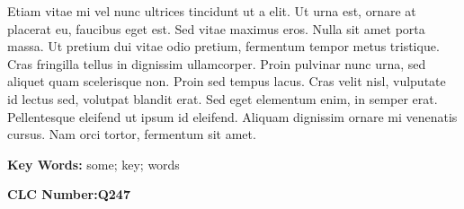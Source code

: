 Etiam vitae mi vel nunc ultrices tincidunt ut a elit. Ut urna est, ornare at placerat eu, faucibus eget est. Sed vitae maximus eros. Nulla sit amet porta massa. Ut pretium dui vitae odio pretium, fermentum tempor metus tristique. Cras fringilla tellus in dignissim ullamcorper. Proin pulvinar nunc urna, sed aliquet quam scelerisque non. Proin sed tempus lacus. Cras velit nisl, vulputate id lectus sed, volutpat blandit erat. Sed eget elementum enim, in semper erat. Pellentesque eleifend ut ipsum id eleifend. Aliquam dignissim ornare mi venenatis cursus. Nam orci tortor, fermentum sit amet.

\bigskip
\noindent \textbf{Key Words:\hspace{\Han}}
some;\;
key;\;
words

\bigskip
\noindent \textbf{CLC Number:\hspace{\Han}Q247}
